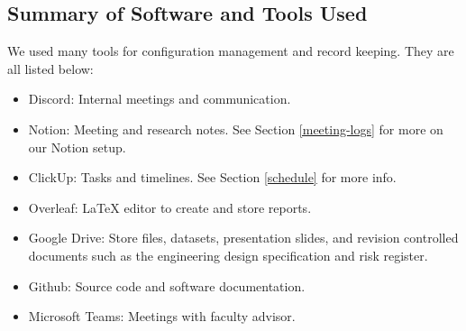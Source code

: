 \documentclass[a4paper,11pt]{article}
\begin{document}
\subsection{Summary of Software and Tools Used}
We used many tools for configuration management and record keeping. They are all listed below:
\begin{itemize}
    \item Discord: Internal meetings and communication.
    \item Notion: Meeting and research notes. See Section \ref{meeting-logs} for more on our Notion setup.
    \item ClickUp: Tasks and timelines. See Section \ref{schedule} for more info.
    \item Overleaf: LaTeX editor to create and store reports.
    \item Google Drive: Store files, datasets, presentation slides, and revision controlled documents such as the engineering design specification and risk register.
    \item Github: Source code and software documentation.
    \item Microsoft Teams: Meetings with faculty advisor.
\end{itemize}
\end{document}
